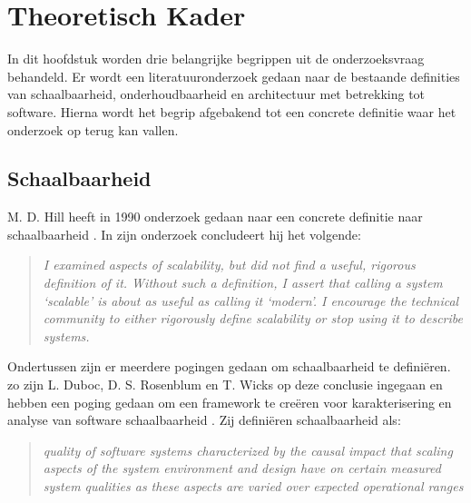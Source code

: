 \chapter{Theoretisch Kader}
\label{Chapter2}

In dit hoofdstuk worden drie belangrijke begrippen uit de onderzoeksvraag behandeld. Er wordt een literatuuronderzoek gedaan naar de bestaande definities van schaalbaarheid, onderhoudbaarheid en architectuur met betrekking tot software. Hierna wordt het begrip afgebakend tot een concrete definitie waar het onderzoek op terug kan vallen.

\section{Schaalbaarheid}

M. D. Hill heeft in 1990 onderzoek gedaan naar een concrete definitie naar schaalbaarheid \parencite{WhatIsScalability}. In zijn onderzoek concludeert hij het volgende:
\begin{quote}
	\textit{
		I examined aspects of scalability, but did not find a useful, rigorous definition of it. Without such a definition, I assert that calling a system ‘scalable’ is about as useful as calling it ‘modern’. I encourage the technical community to either rigorously define scalability or stop using it to describe systems.
	}
\end{quote}
Ondertussen zijn er meerdere pogingen gedaan om schaalbaarheid te definiëren. zo zijn L. Duboc, D. S. Rosenblum en T. Wicks op deze conclusie ingegaan en hebben een poging gedaan om een framework te creëren voor karakterisering en analyse van software schaalbaarheid \parencite{ScalabilityFramework}. Zij definiëren schaalbaarheid als:
\begin{quote}
	\textit{quality of software systems characterized by the causal impact that scaling aspects of the system environment and design have on certain measured system qualities as these aspects are varied over expected operational ranges}
\end{quote}


